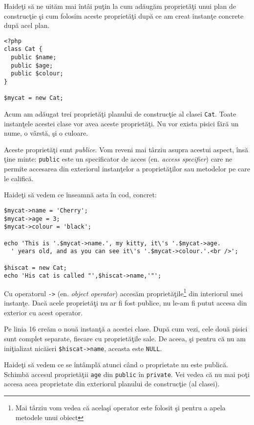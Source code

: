 Haideţi să ne uităm mai întâi puţin la cum adăugăm proprietăţi unui plan de construcţie
şi cum folosim aceste proprietăţi după ce am creat instanţe concrete după acel plan.

\begin{lstlisting}[title=Public Class Properties]
<?php
class Cat {
  public $name;
  public $age;
  public $colour;
}

$mycat = new Cat;
\end{lstlisting}

Acum am adăugat trei proprietăţi planului de construcţie al clasei \texttt{Cat}. Toate
instanţele acestei clase vor avea aceste proprietăţi. Nu vor exista pisici fără un
nume, o vârstă, şi o culoare.

Aceste proprietăţi sunt \textsl{publice}. Vom reveni mai târziu asupra acestui aspect,
însă ţine minte: \texttt{public} este un specificator de acces (en. \textsl{access specifier})
care ne permite accesarea din exteriorul instanţelor a proprietăţilor sau metodelor pe 
care le califică.

Haideţi să vedem ce înseamnă asta în cod, concret:
\begin{lstlisting}[firstnumber=9,title={Public Class Properties}]
$mycat->name = 'Cherry';
$mycat->age = 3;
$mycat->colour = 'black';

echo 'This is '.$mycat->name.', my kitty, it\'s '.$mycat->age.
  ' years old, and as you can see it\'s '.$mycat->colour.'.<br />';

$hiscat = new Cat;
echo 'His cat is called "',$hiscat->name,'"';
\end{lstlisting}

Cu operatorul \texttt{->} (en. \textsl{object operator}) accesăm
proprietăţile\footnote{Mai târziu vom vedea că acelaşi operator este
folosit şi pentru a apela metodele unui obiect} din interiorul unei instanţe.
Dacă acele proprietăţi nu ar fi fost publice, nu le-am fi putut accesa din exterior
cu acest operator.

Pe linia 16 creăm o nouă instanţă a acestei clase. După cum vezi, cele două pisici sunt complet
separate, fiecare cu proprietăţile sale. De aceea, şi pentru
că nu am iniţializat nicăieri \texttt{\$hiscat->name}, aceasta este \texttt{NULL}.


Haideţi să vedem ce se întâmplă atunci când o proprietate nu este publică.
Schimbă accesul proprietăţii \texttt{age} din \texttt{public}
în \texttt{private}. Vei vedea că nu mai poţi accesa acea proprietate din exteriorul planului
de construcţie (al clasei).

